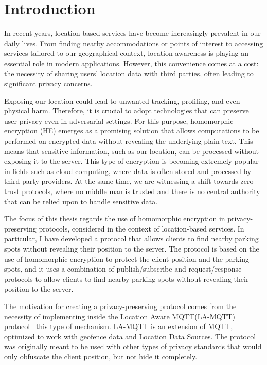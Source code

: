 \chapter{Introduction} \label{chap:intro}

%
%

In recent years, location-based services have become increasingly prevalent in our daily lives. From finding nearby accommodations or points of interest to accessing services tailored to our geographical context, location-awareness is playing an essential role in modern applications. However, this convenience comes at a cost: the necessity of sharing users' location data with third parties, often leading to significant privacy concerns.

Exposing our location could lead to unwanted tracking, profiling, and even physical harm. Therefore, it is crucial to adopt technologies that can preserve user privacy even in adversarial settings. For this purpose, homomorphic encryption (HE) emerges as a promising solution that allows computations to be performed on encrypted data without revealing the underlying plain text. This means that sensitive information, such as our location, can be processed without exposing it to the server. This type of encryption is becoming extremely popular in fields such as cloud computing, where data is often stored and processed by third-party providers. 
At the same time, we are witnessing a shift towards zero-trust protocols, where no middle man is trusted and there is no central authority that can be relied upon to handle sensitive data. 


The focus of this thesis regards the use of homomorphic encryption in privacy-preserving protocols, considered in the context of location-based services. In particular, I have developed a protocol that allows clients to find nearby parking spots without revealing their position to the server. The protocol is based on the use of homomorphic encryption to protect the client position and the parking spots, and it uses a combination of publish/subscribe and request/response protocols to allow clients to find nearby parking spots without revealing their position to the server.

The motivation for creating a privacy-preserving protocol comes from the necessity of implementing inside the Location Aware MQTT(LA-MQTT) protocol~\cite{montori2022lamqtt} this type of mechanism. LA-MQTT is an extension of MQTT, optimized to work with geofence data and Location Data Sources. The protocol was originally meant to be used with other types of privacy standards that would only obfuscate the client position, but not hide it completely.
